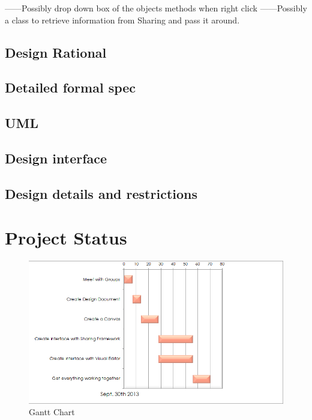 \documentclass[12pt]{article}
\begin{document}


------Possibly drop down box of the objects methods when right click
------Possibly a class to retrieve information from Sharing and pass it around.

\subsection{Design Rational}



\subsection{Detailed formal spec}

\subsection{UML}

\subsection{Design interface}

\subsection{Design details and restrictions}


\section{Project Status}

\begin{figure}[ht!]
\centering
\includegraphics{GanttChart.png}
\caption{Gantt Chart}
\label{overflow}
\end{figure}
\end{document}
